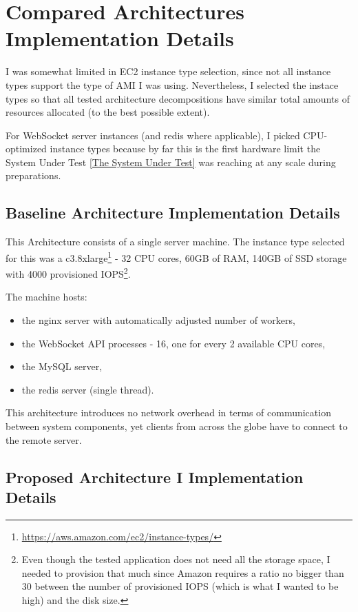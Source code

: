 \documentclass{uvamscse}
\begin{document}
\section{Compared Architectures Implementation Details}\label{Compared Architectures Implementation Details}

I was somewhat limited in EC2 instance type selection, since not all instance types support the type of AMI I was using. Nevertheless, I selected the instace types so that all tested architecture decompositions have similar total amounts of resources allocated (to the best possible extent).

For WebSocket server instances (and redis where applicable), I picked CPU-optimized instance types because by far this is the first hardware limit the System Under Test \ref{The System Under Test} was reaching at any scale during preparations.

\subsection{Baseline Architecture Implementation Details}\label{Baseline Architecture Implementation Details}

This Architecture consists of a single server machine. The instance type selected for this was a c3.8xlarge\footnote{\url{https://aws.amazon.com/ec2/instance-types/}} - 32 CPU cores, 60GB of RAM, 140GB of SSD storage with 4000 provisioned IOPS\footnote{Even though the tested application does not need all the storage space, I needed to provision that much since Amazon requires a ratio no bigger than 30 between the number of provisioned IOPS (which is what I wanted to be high) and the disk size.}.

The machine hosts:
\begin{itemize}
  \item the nginx server with automatically adjusted number of workers,
  \item the WebSocket API processes - 16, one for every 2 available CPU cores,
  \item the MySQL server,
  \item the redis server (single thread).
\end{itemize}

This architecture introduces no network overhead in terms of communication between system components, yet clients from across the globe have to connect to the remote server.

\subsection{Proposed Architecture I Implementation Details}\label{Proposed Architecture I Implementation Details}
\end{document}

